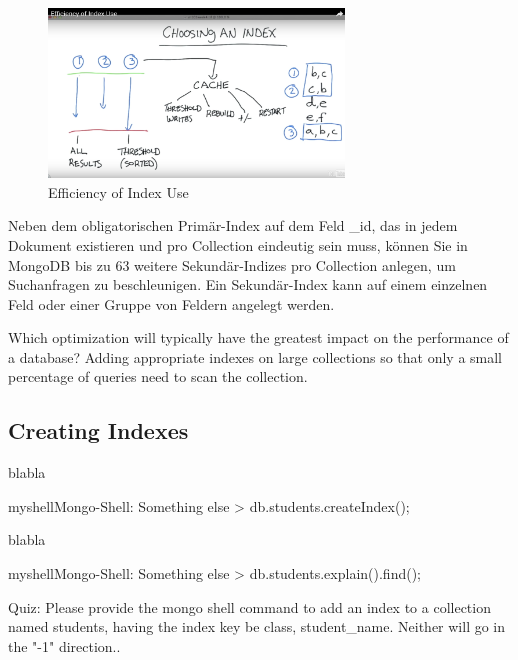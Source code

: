 \begin{figure}[H]
\centering
	\includegraphics[width=0.7\textwidth]{resources/efficiencyOfIndexUse}
\caption[Efficiency of Index Use]{Efficiency of Index Use\protect\footnotemark}
\label{img:EfficiencyofIndexUse}
\end{figure}


Neben dem obligatorischen Primär-Index auf dem Feld \_id, das in jedem Dokument existieren und pro Collection eindeutig sein muss, können Sie in MongoDB bis zu 63 weitere Sekundär-Indizes pro Collection anlegen, um Suchanfragen zu beschleunigen. Ein Sekundär-Index kann auf einem einzelnen Feld oder einer Gruppe von Feldern angelegt werden.%

Which optimization will typically have the greatest impact on the performance of a database?\newline
Adding appropriate indexes on large collections so that only a small percentage of queries need to scan the collection.

\subsection{Creating Indexes}
blabla

\begin{listingsboxShell}[label={lst:X}]{myshell}{Mongo-Shell: Something else}
> db.students.createIndex();
\end{listingsboxShell}

blabla

\begin{listingsboxShell}[label={lst:X}]{myshell}{Mongo-Shell: Something else}
> db.students.explain().find();
\end{listingsboxShell}

Quiz: Please provide the mongo shell command to add an index to a collection named students, having the index key be class, student\_name.
Neither will go in the "-1" direction..

